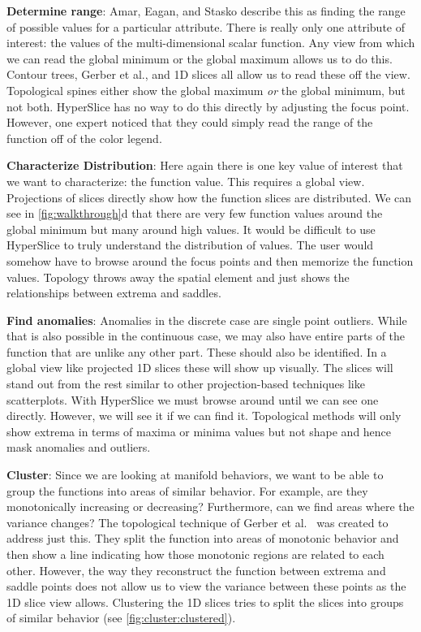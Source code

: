 \textbf{Determine range}:\label{determine-range}
Amar, Eagan, and Stasko describe this as finding the range of possible values
for a particular attribute. There is really only one attribute of interest: the
values of the multi-dimensional scalar function. Any view from which we can
read the global minimum or the global maximum allows us to do this. Contour
trees, Gerber et al., and 1D slices all allow us to read these off the view.
Topological spines either show the global maximum \emph{or} the global minimum,
but not both.  HyperSlice has no way to do this directly by adjusting the focus
point.  However, one expert noticed that they could simply read the range of
the function off of the color legend.

\textbf{Characterize Distribution}:
\label{characterize-distribution}
Here again there is one key value of interest that we want to characterize: the
function value.  This requires a global view.  Projections of slices directly
show how the function slices are distributed.  We can see in
\autoref{fig:walkthrough}d that there are very few function values around the
global minimum but many around high values. It would be difficult to use
HyperSlice to truly understand the distribution of values. The user would
somehow have to browse around the focus points and then memorize the function
values. Topology throws away the spatial element and just shows the
relationships between extrema and saddles.

\textbf{Find anomalies}:\label{find-anomalies}
Anomalies in the discrete case are single point outliers. While that is also
possible in the continuous case, we may also have entire parts of the function
that are unlike any other part. These should also be identified.
In a global view like projected 1D slices these will show up visually. The
slices will stand out from the rest similar to other projection-based
techniques like scatterplots. With HyperSlice we must browse around until we
can see one directly. However, we will see it if we can find it. Topological
methods will only show extrema in terms of maxima or minima values but not
shape and hence mask anomalies and outliers.

\textbf{Cluster}:\label{cluster}
Since we are looking at manifold behaviors, we want to be able to group the
functions into areas of similar behavior. For example, are they monotonically
increasing or decreasing? Furthermore, can we find areas where the variance
changes? The topological technique of Gerber et al.~\cite{Gerber:2010} was
created to address just this. They split the function
into areas of monotonic behavior and then show a line indicating how those
monotonic regions are related to each other. However, the way they
reconstruct the function between extrema and saddle points does not allow us to
view the variance between these points as the 1D slice view
allows. Clustering the 1D slices tries to split the slices into groups of
similar behavior (see \autoref{fig:cluster:clustered}).

